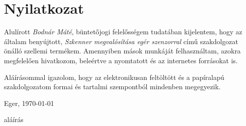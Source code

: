 \documentclass{thesis-ekf}
\begin{document}
\chapter*{Nyilatkozat}
\thispagestyle{empty}

Alulírott \emph{Bodnár Máté}, büntetőjogi felelősségem tudatában kijelentem, hogy az általam benyújtott, \emph{Szkenner megvalósítása egér szenzorral} című szakdolgozat önálló szellemi termékem. Amennyiben mások munkáját felhasználtam, azokra megfelelően hivatkozom, beleértve a nyomtatott és az internetes forrásokat is.

Aláírásommal igazolom, hogy az elektronikusan feltöltött és a papíralapú szakdolgozatom formai és tartalmi szempontból mindenben megegyezik.

\bigskip
\begin{flushleft}
Eger, \today
\end{flushleft}

\bigskip
\begin{flushright}
aláírás\hspace{3cm}\mbox{}
\end{flushright}

\end{document}
